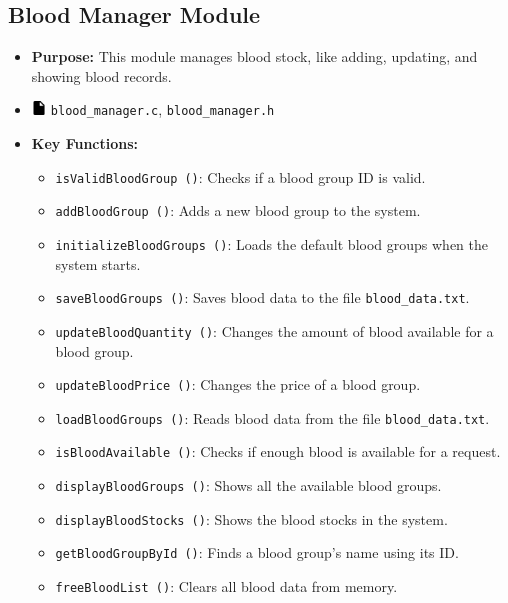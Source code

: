 \documentclass[12pt,a4paper]{report}
\begin{document}
\subsection{Blood Manager Module}
\begin{itemize}
    \item \normalsize \textbf{Purpose:} This module manages blood stock, like adding, updating, and showing blood records.
    \item \normalsize \includegraphics[width=0.03\textwidth]{../resources/assets/images/file_icon.png} \texttt{blood\_manager.c}, \texttt{blood\_manager.h}
    \item \normalsize \textbf{Key Functions:}
    \begin{itemize}
        \item \texttt{isValidBloodGroup ()}: Checks if a blood group ID is valid.
        \item \texttt{addBloodGroup ()}: Adds a new blood group to the system.
        \item \texttt{initializeBloodGroups ()}: Loads the default blood groups when the system starts.
        \item \texttt{saveBloodGroups ()}: Saves blood data to the file \texttt{blood\_data.txt}.
        \item \texttt{updateBloodQuantity ()}: Changes the amount of blood available for a blood group.
        \item \texttt{updateBloodPrice ()}: Changes the price of a blood group.
        \item \texttt{loadBloodGroups ()}: Reads blood data from the file \texttt{blood\_data.txt}.
        \item \texttt{isBloodAvailable ()}: Checks if enough blood is available for a request.
        \item \texttt{displayBloodGroups ()}: Shows all the available blood groups.
        \item \texttt{displayBloodStocks ()}: Shows the blood stocks in the system.
        \item \texttt{getBloodGroupById ()}: Finds a blood group's name using its ID.\
        \item \texttt{freeBloodList ()}: Clears all blood data from memory.
    \end{itemize}
\end{itemize}
\end{document}
